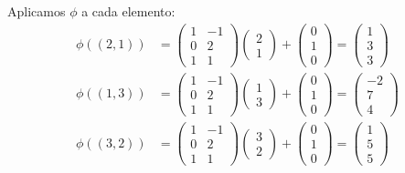 \begin{example}
Aplicamos $\phi$ a cada elemento:
\begin{align}
\phi((2,1)) &= \begin{pmatrix} 1 & -1 \\ 0 & 2 \\ 1 & 1 \end{pmatrix} \begin{pmatrix} 2 \\ 1 \end{pmatrix} + \begin{pmatrix} 0 \\ 1 \\ 0 \end{pmatrix} = \begin{pmatrix} 1 \\ 3 \\ 3 \end{pmatrix} \\
\phi((1,3)) &= \begin{pmatrix} 1 & -1 \\ 0 & 2 \\ 1 & 1 \end{pmatrix} \begin{pmatrix} 1 \\ 3 \end{pmatrix} + \begin{pmatrix} 0 \\ 1 \\ 0 \end{pmatrix} = \begin{pmatrix} -2 \\ 7 \\ 4 \end{pmatrix} \\
\phi((3,2)) &= \begin{pmatrix} 1 & -1 \\ 0 & 2 \\ 1 & 1 \end{pmatrix} \begin{pmatrix} 3 \\ 2 \end{pmatrix} + \begin{pmatrix} 0 \\ 1 \\ 0 \end{pmatrix} = \begin{pmatrix} 1 \\ 5 \\ 5 \end{pmatrix}
\end{align}


\end{example}
